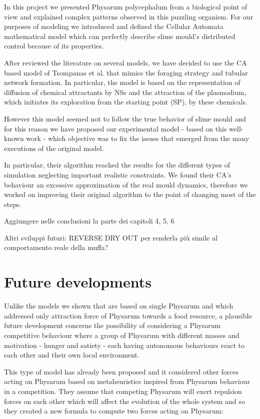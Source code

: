In this project we presented Physarum polycephalum from a biological point of view and explained complex patterns observed in this puzzling organism. For our purposes of modeling we introduced and defined the Cellular Automata mathematical model  which can perfectly describe slime mould's distributed control because of its properties.

\par
After reviewed the literature on several models, we have decided to use the CA based model of Tsompanas et al. \cite{Tsompanas2016} that mimics the foraging strategy and tubular network formation. In particular, the model is based on the representation of diffusion of chemical attractants by NSs and the attraction of the plasmodium, which initiates its exploration from the starting point (SP), by these chemicals. 

\par
However this model seemed not to follow the true behavior of slime mould and for this reason we have proposed our experimental model - based on this well-known work - which objective was to fix the issues that emerged from the many executions of the original model.

\par
In particular, their algorithm reached the results for the different types of simulation neglecting important realistic constraints. We found their CA's behaviour an excessive approximation of the real mould dynamics, therefore we worked on improving their original algorithm to the point of changing most of the steps.

Aggiungere nelle conclusioni la parte dei capitoli 4, 5, 6

Altri sviluppi futuri: REVERSE DRY OUT per renderla più simile al comportamento reale della muffa?
\section{Future developments}

Unlike the models we shown that are based on single Physarum and which addressed only attraction force of Physarum towards a food resource, a plausible future development concerns the possibility of considering a Physarum competitive behaviour where a group of Physarum with different masses and motivation - hunger and satiety - each having autonomous behaviours react to each other and their own local environment. 

\par
This type of model has already been proposed \cite{hex_phy} and it considered other forces acting on Physarum based on metaheuristics inspired from Physarum behaviour in a competition. They assume that competing Physarum will exert repulsion forces on each other which will affect the evolution of the whole system and so they created a new formula to compute two forces acting on Physarum: 

